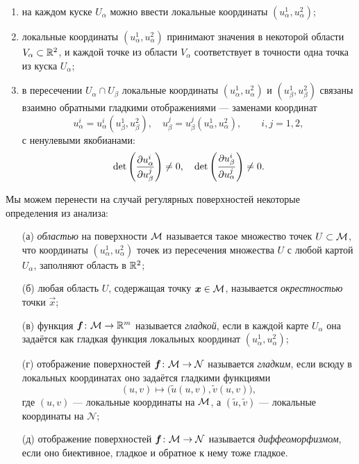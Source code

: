 \begin{enumerate}[nolistsep, label=(\arabic*)]
	\item на каждом куске $U_\alpha$ можно ввести локальные координаты $(u^1_\alpha, u^2_\alpha)$;
	\item локальные координаты $(u^1_\alpha, u^2_\alpha)$ принимают значения в некоторой области $V_\alpha \subset \mathbb{R}^2$, и каждой точке из области $V_\alpha$ соответствует в точности одна точка из куска $U_\alpha$;
	\item в пересечении $U_\alpha \cap U_\beta$ локальные координаты $(u^1_\alpha, u^2_\alpha)$ и $(u^1_\beta, u^2_\beta)$ связаны взаимно обратными гладкими отображениями --- заменами координат
		\[
			u^i_\alpha = u^i_\alpha(u^1_\beta, u^2_\beta),\quad u^j_\beta = u^j_\beta(u^1_\alpha, u^2_\alpha),\qquad i, j = 1, 2,
		\]
		с ненулевыми якобианами:
		\[
			\det\left(\frac{\partial u^i_\alpha}{\partial u^j_\beta}\right) \ne 0,\quad \det\left(\frac{\partial u^i_\beta}{\partial u^j_\alpha}\right) \ne 0.
		\]
\end{enumerate}

Мы можем перенести на случай регулярных поверхностей некоторые определения из анализа:

\begin{enumerate}[nolistsep]
	\item[(а)] \textit{областью} на поверхности $\mathcal{M}$ называется такое множество точек $U \subset \mathcal{M}$, что координаты $(u_\alpha^1, u_\alpha^2)$ точек из пересечения множества $U$ с любой картой $U_\alpha$, заполняют область в $\mathbb{R}^2$;
	\item[(б)] любая область $U$, содержащая точку $\boldsymbol{x} \in \mathcal{M}$, называется \textit{окрестностью} точки $\vec{x}$;
	\item[(в)] функция $\boldsymbol{f}\colon \mathcal{M} \to \mathbb{R}^m$ называется \textit{гладкой}, если в каждой карте $U_\alpha$ она задаётся как гладкая функция локальных координат $(u_\alpha^1, u_\alpha^2)$;
	\item[(г)] отображение поверхностей $\boldsymbol{f}\colon \mathcal{M} \to \mathcal{N}$ называется \textit{гладким}, если всюду в локальных координатах оно задаётся гладкими функциями
		\[
			(u, v) \mapsto \big(\widetilde{u}(u, v), \widetilde{v}(u, v)\big),
		\]
		где $(u, v)$ --- локальные координаты на $\mathcal{M}$, а $(\widetilde{u}, \widetilde{v})$ --- локальные координаты на $\mathcal{N}$;
	\item[(д)] отображение поверхностей $\boldsymbol{f}\colon \mathcal{M} \to \mathcal{N}$ называется \textit{диффеоморфизмом}, если оно биективное, гладкое и обратное к нему тоже гладкое.
\end{enumerate}

